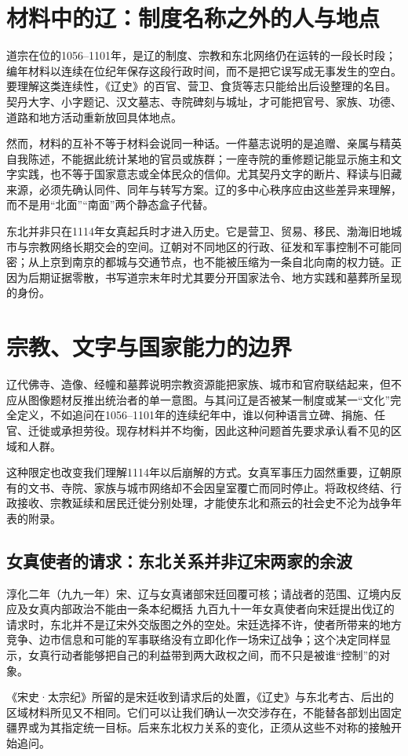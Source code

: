 \section{材料中的辽：制度名称之外的人与地点}

道宗在位的1056--1101年，是辽的制度、宗教和东北网络仍在运转的一段长时段；编年材料以连续在位纪年保存这段行政时间，而不是把它误写成无事发生的空白。要理解这类连续性，《辽史》的百官、营卫、食货等志只能给出后设整理的名目。契丹大字、小字题记、汉文墓志、寺院碑刻与城址，才可能把官号、家族、功德、道路和地方活动重新放回具体地点。

然而，材料的互补不等于材料会说同一种话。一件墓志说明的是追赠、亲属与精英自我陈述，不能据此统计某地的官员或族群；一座寺院的重修题记能显示施主和文字实践，也不等于国家意志或全体民众的信仰。尤其契丹文字的断片、释读与旧藏来源，必须先确认同件、同年与转写方案。辽的多中心秩序应由这些差异来理解，而不是用“北面”“南面”两个静态盒子代替。

东北并非只在1114年女真起兵时才进入历史。它是营卫、贸易、移民、渤海旧地城市与宗教网络长期交会的空间。辽朝对不同地区的行政、征发和军事控制不可能同密；从上京到南京的都城与交通节点，也不能被压缩为一条自北向南的权力链。正因为后期证据零散，书写道宗末年时尤其要分开国家法令、地方实践和墓葬所呈现的身份。

\section{宗教、文字与国家能力的边界}

辽代佛寺、造像、经幢和墓葬说明宗教资源能把家族、城市和官府联结起来，但不应从图像题材反推出统治者的单一意图。与其问辽是否被某一制度或某一“文化”完全定义，不如追问在1056--1101年的连续纪年中，谁以何种语言立碑、捐施、任官、迁徙或承担劳役。现存材料并不均衡，因此这种问题首先要求承认看不见的区域和人群。

这种限定也改变我们理解1114年以后崩解的方式。女真军事压力固然重要，辽朝原有的文书、寺院、家族与城市网络却不会因皇室覆亡而同时停止。将政权终结、行政接收、宗教延续和居民迁徙分别处理，才能使东北和燕云的社会史不沦为战争年表的附录。

\subsection{女真使者的请求：东北关系并非辽宋两家的余波}
\begin{event}{}{淳化二年（九九一年）}{宋、辽与女真诸部}{宋廷回覆可核；请战者的范围、辽境内反应及女真内部政治不能由一条本纪概括}
九百九十一年女真使者向宋廷提出伐辽的请求时，东北并不是辽宋外交版图之外的空处。宋廷选择不许，使者所带来的地方竞争、边市信息和可能的军事联络没有立即化作一场宋辽战争；这个决定同样显示，女真行动者能够把自己的利益带到两大政权之间，而不只是被谁“控制”的对象。

《宋史·太宗纪》所留的是宋廷收到请求后的处置，《辽史》与东北考古、后出的区域材料所见又不相同。它们可以让我们确认一次交涉存在，不能替各部划出固定疆界或为其指定统一目标。后来东北权力关系的变化，正须从这些不对称的接触开始追问。
\end{event}